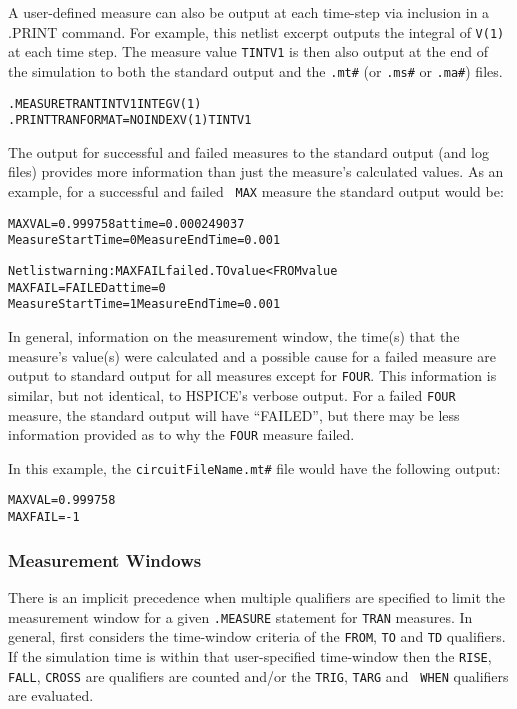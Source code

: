 A user-defined measure can also be output at each time-step via
inclusion in a .PRINT command.  For example, this netlist excerpt
outputs the integral of {\tt V(1)} at each time step.  The measure
value {\tt TINTV1} is then also output at the end of the simulation to
both the standard output and the \texttt{.mt\#} (or \texttt{.ms\#}
or \texttt{.ma\#}) files.
\begin{alltt}
.MEASURE TRAN TINTV1 INTEG V(1)
.PRINT TRAN FORMAT=NOINDEX V(1) TINTV1
\end{alltt}

The output for successful and failed measures to the standard output
(and log files) provides more information than just the measure's
calculated values.  As an example, for a successful and failed {\tt
MAX} measure the standard output would be:

\begin{alltt}
MAXVAL = 0.999758 at time = 0.000249037
Measure Start Time= 0	Measure End Time= 0.001

Netlist warning: MAXFAIL failed. TO value < FROM value
MAXFAIL = FAILED at time = 0
Measure Start Time= 1	Measure End Time= 0.001
\end{alltt}

In general, information on the measurement window, the time(s) that
the measure's value(s) were calculated and a possible cause for a
failed measure are output to standard output for all measures except
for {\tt FOUR}. This information is similar, but not identical, to
HSPICE's verbose output.  For a failed {\tt FOUR} measure, the
standard output will have ``FAILED'', but there may be less
information provided as to why the {\tt FOUR} measure failed.

In this example, the \texttt{circuitFileName.mt\#} file would have the following output:
\begin{alltt}
MAXVAL = 0.999758
MAXFAIL = -1
\end{alltt}

\subsubsection{Measurement Windows}
\label{Measure_Measurement_Windows}
There is an implicit precedence when multiple qualifiers are specified
to limit the measurement window for a given {\tt .MEASURE} statement
for {\tt TRAN} measures.  In general, \Xyce{} first considers the
time-window criteria of the {\tt FROM}, {\tt TO} and {\tt TD}
qualifiers.  If the simulation time is within that user-specified
time-window then the {\tt RISE}, {\tt FALL}, {\tt CROSS} are
qualifiers are counted and/or the {\tt TRIG}, {\tt TARG} and {\tt
WHEN} qualifiers are evaluated.

